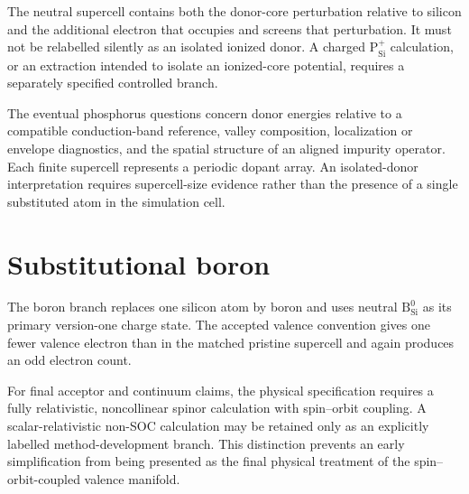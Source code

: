 The neutral supercell contains both the donor-core perturbation relative to
silicon and the additional electron that occupies and screens that
perturbation. It must not be relabelled silently as an isolated ionized donor.
A charged $\mathrm{P}_{\mathrm{Si}}^{+}$ calculation, or an extraction intended
to isolate an ionized-core potential, requires a separately specified
controlled branch.

The eventual phosphorus questions concern donor energies relative to a
compatible conduction-band reference, valley composition, localization or
envelope diagnostics, and the spatial structure of an aligned impurity
operator. Each finite supercell represents a periodic dopant array. An
isolated-donor interpretation requires supercell-size evidence rather than the
presence of a single substituted atom in the simulation cell.


\section{Substitutional boron}


The boron branch replaces one silicon atom by boron and uses neutral
$\mathrm{B}_{\mathrm{Si}}^{0}$ as its primary version-one charge state. The
accepted valence convention gives one fewer valence electron than in the
matched pristine supercell and again produces an odd electron count.

For final acceptor and continuum claims, the physical specification requires a
fully relativistic, noncollinear spinor calculation with spin--orbit coupling.
A scalar-relativistic non-SOC calculation may be retained only as an explicitly
labelled method-development branch. This distinction prevents an early
simplification from being presented as the final physical treatment of the
spin--orbit-coupled valence manifold.


